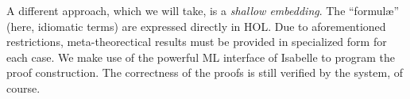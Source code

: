 A different approach, which we will take, is a \emph{shallow embedding}.
The ``formul\ae'' (here, idiomatic terms) are expressed directly in HOL.
Due to aforementioned restrictions, meta-theorectical results must be provided
in specialized form for each case.
We make use of the powerful ML interface of Isabelle to program the proof
construction.
The correctness of the proofs is still verified by the system, of course.
